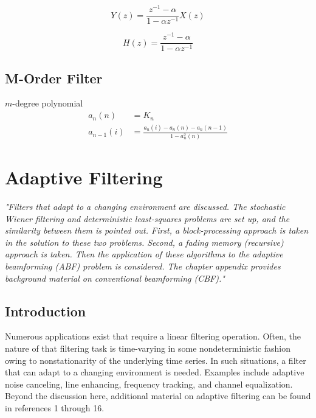 \documentclass[11pt]{report}
\theoremstyle{example}
\begin{document}
\begin{equation}
	Y(z)=\frac{z^{-1}-\alpha}{1-\alpha z^{-1}}X(z)
\end{equation}

\begin{equation}
	H(z)=\frac{z^{-1}-\alpha}{1-\alpha z^{-1}}
\end{equation}

\section {M-Order Filter}

$m$-degree polynomial
\begin{align}
	a_n(n)&=K_n\\
	a_{n-1}(i)&=\frac{a_n(i)-a_n(n)-a_n(n-1)}{1-a_n^2(n)}
\end{align}

\chapter{Adaptive Filtering}
\begin{center}
\textit{"Filters that adapt to a changing environment are discussed. The stochastic Wiener filtering and deterministic least-squares problems are set up, and the similarity between them is pointed out. First, a block-processing approach is taken in the solution to these two problems. Second, a fading memory (recursive) approach is taken. Then the application of these algorithms to the adaptive beamforming (ABF) problem is considered. The chapter appendix provides background material on conventional beamforming (CBF)."}
\end{center}
\vspace{1em}
\setcounter{section}{-1}
\section{Introduction}
Numerous applications exist that require a linear filtering operation. Often, the nature of that filtering task is time-varying in some nondeterministic fashion owing to nonstationarity of the underlying time series. In such situations, a filter that can adapt to a changing environment is needed. Examples include adaptive noise canceling, line enhancing, frequency tracking, and channel equalization. Beyond the discussion here, additional material on adaptive filtering can be found in references 1 through 16.
\end{document}
